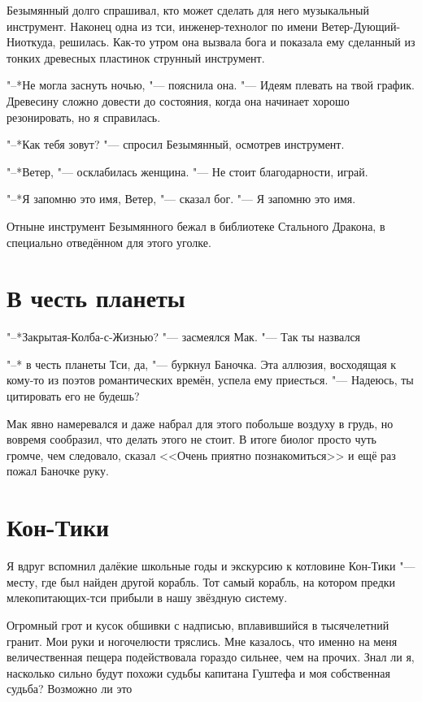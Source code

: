 Безымянный долго спрашивал, кто может сделать для него музыкальный инструмент.
Наконец одна из тси, инженер-технолог по имени Ветер-Дующий-Ниоткуда, решилась.
Как-то утром она вызвала бога и показала ему сделанный из тонких древесных пластинок струнный инструмент.

"--*Не могла заснуть ночью, "--- пояснила она.
"--- Идеям плевать на твой график.
Древесину сложно довести до состояния, когда она начинает хорошо резонировать, но я справилась.

"--*Как тебя зовут? "--- спросил Безымянный, осмотрев инструмент.

"--*Ветер, "--- осклабилась женщина.
"--- Не стоит благодарности, играй.

"--*Я запомню это имя, Ветер, "--- сказал бог.
"--- Я запомню это имя.

Отныне инструмент Безымянного бежал в библиотеке Стального Дракона, в специально отведённом для этого уголке.

\section{В честь планеты}

"--*Закрытая-Колба-с-Жизнью? "--- засмеялся Мак.
"--- Так ты назвался\ldotst

"--* \ldotst в честь планеты Тси, да, "--- буркнул Баночка.
Эта аллюзия, восходящая к кому-то из поэтов романтических времён, успела ему приесться.
"--- Надеюсь, ты цитировать его не будешь?

Мак явно намеревался и даже набрал для этого побольше воздуху в грудь, но вовремя сообразил, что делать этого не стоит.
В итоге биолог просто чуть громче, чем следовало, сказал <<Очень приятно познакомиться>> и ещё раз пожал Баночке руку.

\section{Кон-Тики}

Я вдруг вспомнил далёкие школьные годы и экскурсию к котловине Кон-Тики "--- месту, где был найден другой корабль.
Тот самый корабль, на котором предки млекопитающих-тси прибыли в нашу звёздную систему.

Огромный грот и кусок обшивки с надписью, вплавившийся в тысячелетний гранит.
Мои руки и ногочелюсти тряслись.
Мне казалось, что именно на меня величественная пещера подействовала гораздо сильнее, чем на прочих.
Знал ли я, насколько сильно будут похожи судьбы капитана Гуштефа и моя собственная судьба?
Возможно ли это\ldotsq

